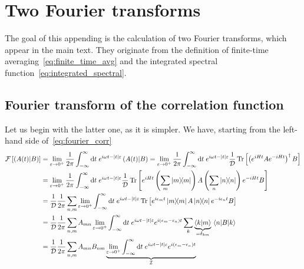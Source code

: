 \chapter{Two Fourier transforms\label{app:fourier}}
\thispagestyle{chapterBeginStyle}
The goal of this appending is the calculation of two Fourier transforms, which appear in the main text.
They originate from the definition of finite-time averaging~\eqref{eq:finite_time_avg} and
the integrated spectral function~\eqref{eq:integrated_spectral}. 

\section{Fourier transform of the correlation function}
Let us begin with the latter one,
as it is simpler. We have, starting from the left-hand side of~\eqref{eq:fourier_corr}
\begin{align}
    \mathcal{F}\left[\hs{A(t)}{B}\right] & = \lim _{\varepsilon \to 0^+} \frac{1}{2 \pi} \int_{-\infty}^{\infty} \mathrm{d} t
    \; e^{i \omega t-|t| \varepsilon}\hs{A(t)}{B} = \lim _{\varepsilon \to 0^+} \frac{1}{2 \pi}
    \int_{-\infty}^{\infty} \mathrm{d} t \; e^{i \omega t-|t| \varepsilon} \frac{1}{\dimension}
    \Tr\left[\left(e^{iHt}Ae^{-iHt}\right)^{\dagger}B\right] \nonumber                                                                    \\
                                         & =\lim _{\varepsilon \to 0^+} \frac{1}{2 \pi}
    \int_{-\infty}^{\infty} \mathrm{d} t \; e^{i \omega t-|t| \varepsilon} \frac{1}{\dimension}
    \Tr\left[e^{iHt}\left(\sum_{m} \ketbra{m}{m}\right)
    A\left(\sum_{n} \ketbra{n}{n}\right)e^{-iHt}B\right] \nonumber                                                                        \\
                                         & = \frac{1}{\dimension} \frac{1}{2 \pi}\sum_{n,m} \lim _{\varepsilon \to 0^+}
    \int_{-\infty}^{\infty} \mathrm{d} t \; e^{i \omega t-|t| \varepsilon}
    \Tr\left[e^{i \epsilon_m t}\ketbra{m}{m} A\ketbra{n}{n}e^{-i \epsilon_n t}B\right] \nonumber                                          \\
                                         & = \frac{1}{\dimension} \frac{1}{2 \pi}\sum_{n,m} A_{mn}  \lim _{\varepsilon \to 0^+}
    \int_{-\infty}^{\infty} \mathrm{d} t \; e^{i \omega t-|t| \varepsilon}e^{i (\epsilon_m-\epsilon_n) t}
    \sum_{k} \underbrace{\braket{k}{m}}_{=\delta_{km}} \matrixel{n}{B}{k} \nonumber                                                       \\
                                         & = \frac{1}{\dimension} \frac{1}{2 \pi}\sum_{n,m} A_{mn} B_{nm}  \underbrace{\lim _{\varepsilon
        \to 0^+} \int_{-\infty}^{\infty} \mathrm{d} t \; e^{i \omega t-|t|
            \varepsilon}e^{i (\epsilon_m-\epsilon_n) t}}_{\mathcal{I}}\label{eq:spectral function simplified}
\end{align}
